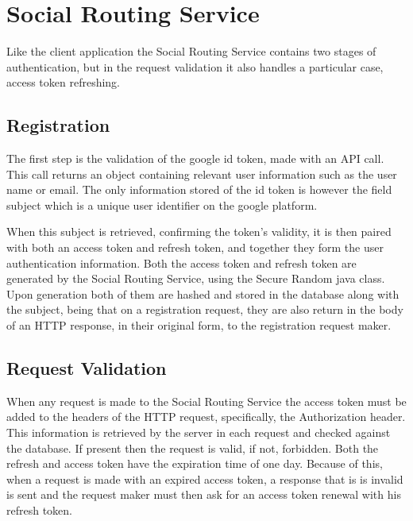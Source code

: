 \section{Social Routing Service}
    Like the client application the Social Routing Service contains two stages of authentication, but in the request validation
    it also handles a particular case, access token refreshing. 
    \subsection{Registration}
    The first step is the validation of the google id token, made with an API call. This call returns an object containing
    relevant user information such as the user name or email. The only information stored of the id token is however the field
    subject which is a unique user identifier on the google platform.   

    When this subject is retrieved, confirming the token's validity, it is then paired with both an access token and refresh 
    token, and together they form the user authentication information. Both the access token and refresh token are generated
    by the Social Routing Service, using the Secure Random java class. Upon generation both of them are hashed and stored 
    in the database along with the subject, being that on a registration request, they are also return in the body of an HTTP
    response, in their original form, to the registration request maker. 
    
    \subsection{Request Validation}
    When any request is made to the Social Routing Service the access token must be added to the headers of the HTTP request,
    specifically, the Authorization header. This information is retrieved by the server in each request and checked against 
    the database. If present then the request is valid, if not, forbidden. Both the refresh and access token have the expiration
    time of one day. Because of this, when a request is made with an expired access token, a response that is is invalid
    is sent and the request maker must then ask for an access token renewal with his refresh token. 
